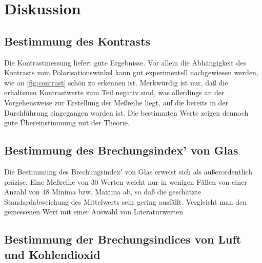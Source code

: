 
\section{Diskussion}

\subsection{Bestimmung des Kontrasts}

Die Kontrastmessung liefert gute Ergebnisse.  Vor allem die Abhängigkeit
des Kontrasts vom Polarisationswinkel kann gut experimentell
nachgewiesen werden, wie an \cref{fig:contrast} schön zu erkennen ist.
Merkwürdig ist nur, daß die erhaltenen Kontrastwerte zum Teil negativ
sind, was allerdings an der Vorgehensweise zur Erstellung der Meßreihe
liegt, auf die bereits in der Durchführung eingegangen worden ist.  Die
bestimmten Werte zeigen dennoch gute Übereinstimmung mit der Theorie.

\subsection{Bestimmung des Brechungsindex' von Glas}

Die Bestimmung des Brechungsindex' von Glas erweist sich als
außerordentlich präzise.  Eine Meßreihe von 30 Werten weicht nur in
wenigen Fällen von einer Anzahl von 48 Minima bzw. Maxima ab, so daß
die geschätzte Standardabweichung des Mittelwerts sehr gering ausfällt.
Vergleicht man den gemessenen Wert mit einer Auswahl von Literaturwerten

\subsection{Bestimmung der Brechungsindices von Luft und Kohlendioxid}
